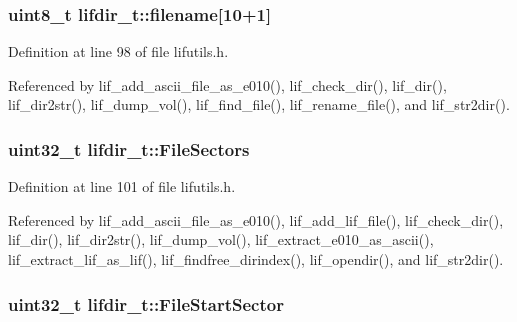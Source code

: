 \subsubsection[{\texorpdfstring{filename}{filename}}]{\setlength{\rightskip}{0pt plus 5cm}uint8\+\_\+t lifdir\+\_\+t\+::filename\mbox{[}10+1\mbox{]}}\hypertarget{structlifdir__t_a700fd2eb77539353ba670b76d9acb29d}{}\label{structlifdir__t_a700fd2eb77539353ba670b76d9acb29d}


Definition at line 98 of file lifutils.\+h.



Referenced by lif\+\_\+add\+\_\+ascii\+\_\+file\+\_\+as\+\_\+e010(), lif\+\_\+check\+\_\+dir(), lif\+\_\+dir(), lif\+\_\+dir2str(), lif\+\_\+dump\+\_\+vol(), lif\+\_\+find\+\_\+file(), lif\+\_\+rename\+\_\+file(), and lif\+\_\+str2dir().

\subsubsection[{\texorpdfstring{File\+Sectors}{FileSectors}}]{\setlength{\rightskip}{0pt plus 5cm}uint32\+\_\+t lifdir\+\_\+t\+::\+File\+Sectors}\hypertarget{structlifdir__t_a92382e062294ebdc632c6c78dcd397aa}{}\label{structlifdir__t_a92382e062294ebdc632c6c78dcd397aa}


Definition at line 101 of file lifutils.\+h.



Referenced by lif\+\_\+add\+\_\+ascii\+\_\+file\+\_\+as\+\_\+e010(), lif\+\_\+add\+\_\+lif\+\_\+file(), lif\+\_\+check\+\_\+dir(), lif\+\_\+dir(), lif\+\_\+dir2str(), lif\+\_\+dump\+\_\+vol(), lif\+\_\+extract\+\_\+e010\+\_\+as\+\_\+ascii(), lif\+\_\+extract\+\_\+lif\+\_\+as\+\_\+lif(), lif\+\_\+findfree\+\_\+dirindex(), lif\+\_\+opendir(), and lif\+\_\+str2dir().

\subsubsection[{\texorpdfstring{File\+Start\+Sector}{FileStartSector}}]{\setlength{\rightskip}{0pt plus 5cm}uint32\+\_\+t lifdir\+\_\+t\+::\+File\+Start\+Sector}\hypertarget{structlifdir__t_ac17bb6f653b05078f5fc8112c21286f2}{}\label{structlifdir__t_ac17bb6f653b05078f5fc8112c21286f2}


